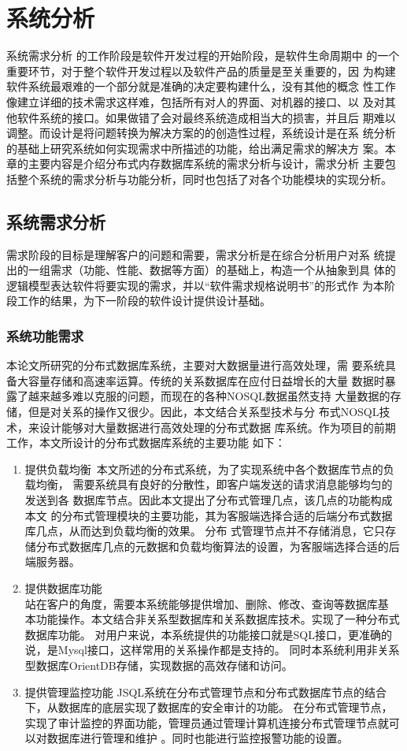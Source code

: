 
\chapter{系统分析}
系统需求分析
的工作阶段是软件开发过程的开始阶段，是软件生命周期中
的一个重要环节，对于整个软件开发过程以及软件产品的质量是至关重要的，因
为构建软件系统最艰难的一个部分就是准确的决定要构建什么，没有其他的概念
性工作像建立详细的技术需求这样难，包括所有对人的界面、对机器的接口、以
及对其他软件系统的接口。如果做错了会对最终系统造成相当大的损害，并且后
期难以调整。而设计是将问题转换为解决方案的的创造性过程，系统设计是在系
统分析的基础上研究系统如何实现需求中所描述的功能，给出满足需求的解决方
案。本章的主要内容是介绍分布式内存数据库系统的需求分析与设计，需求分析
主要包括整个系统的需求分析与功能分析，同时也包括了对各个功能模块的实现分析。
\section{系统需求分析}
需求阶段的目标是理解客户的问题和需要，需求分析是在综合分析用户对系
统提出的一组需求（功能、性能、数据等方面）的基础上，构造一个从抽象到具
体的逻辑模型表达软件将要实现的需求，并以“软件需求规格说明书”的形式作
为本阶段工作的结果，为下一阶段的软件设计提供设计基础。
\subsection{系统功能需求}
本论文所研究的分布式数据库系统，主要对大数据量进行高效处理，需
要系统具备大容量存储和高速率运算。传统的关系数据库在应付日益增长的大量
数据时暴露了越来越多难以克服的问题，而现在的各种NOSQL数据虽然支持
大量数据的存储，但是对关系的操作又很少。因此，本文结合关系型技术与分
布式NOSQL技术，来设计能够对大量数据进行高效处理的分布式数据
库系统。作为项目的前期工作，本文所设计的分布式数据库系统的主要功能
如下：
\begin{enumerate}
	\item 提供负载均衡\
	本文所述的分布式系统，为了实现系统中各个数据库节点的负载均衡，
	需要系统具有良好的分散性，即客户端发送的请求消息能够均匀的发送到各
	数据库节点。因此本文提出了分布式管理几点，该几点的功能构成本文
	的分布式管理模块的主要功能，其为客服端选择合适的后端分布式数据库几点，从而达到负载均衡的效果。
	分布
	式管理节点并不存储消息，它只存储分布式数据库几点的元数据和负载均衡算法的设置，为客服端选择合适的后端服务器。
	\item 提供数据库功能\\
	站在客户的角度，需要本系统能够提供增加、删除、修改、查询等数据库基
	本功能操作。本文结合非关系型数据库和关系数据库技术。实现了一种分布式数据库功能。
	对用户来说，本系统提供的功能接口就是SQL接口，更准确的说，是Mysql接口，这样常用的关系操作都是支持的。
	同时本系统利用非关系型数据库OrientDB存储，实现数据的高效存储和访问。
	\item 提供管理监控功能
	JSQL系统在分布式管理节点和分布式数据库节点的结合下，从数据库的底层实现了数据库的安全审计的功能。
	在分布式管理节点，实现了审计监控的界面功能，管理员通过管理计算机连接分布式管理节点就可以对数据库进行管理和维护
	。同时也能进行监控报警功能的设置。
\end{enumerate}	

